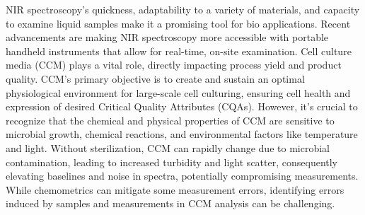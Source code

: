 \documentclass[12pt]{report}
\renewcommand{\cite}{\supercite}
\begin{document}
NIR spectroscopy's quickness, adaptability to a variety of materials, and capacity to examine liquid samples make it a promising tool for bio applications.\cite{NearInfraredSpectroscopyBioApplicationsbec2020} Recent advancements are making NIR spectroscopy more accessible with portable handheld instruments that allow for real-time, on-site examination. 
Cell culture media (CCM) plays a vital role, directly impacting process yield and product quality.\cite{CellCultureMediaryder2018} CCM's primary objective is to create and sustain an optimal physiological environment for large-scale cell culturing, ensuring cell health and expression of desired Critical Quality Attributes (CQAs). However, it's crucial to recognize that the chemical and physical properties of CCM are sensitive to microbial growth, chemical reactions, and environmental factors like temperature and light. Without sterilization, CCM can rapidly change due to microbial contamination, leading to increased turbidity and light scatter, consequently elevating baselines and noise in spectra, potentially compromising measurements. While chemometrics can mitigate some measurement errors, identifying errors induced by samples and measurements in CCM analysis can be challenging.
\end{document}
